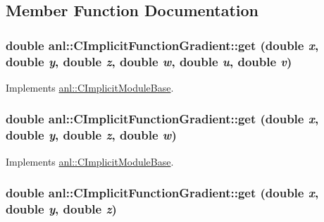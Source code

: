 \subsection{Member Function Documentation}
\hypertarget{classanl_1_1CImplicitFunctionGradient_ad37b8c002f1b4b44f0dd8af144fa59a8}{
\subsubsection[{get}]{\setlength{\rightskip}{0pt plus 5cm}double anl::CImplicitFunctionGradient::get (double {\em x}, \/  double {\em y}, \/  double {\em z}, \/  double {\em w}, \/  double {\em u}, \/  double {\em v})}}
\label{classanl_1_1CImplicitFunctionGradient_ad37b8c002f1b4b44f0dd8af144fa59a8}


Implements \hyperlink{classanl_1_1CImplicitModuleBase_aa40b7d54572197612a4fea44b63447eb}{anl::CImplicitModuleBase}.\hypertarget{classanl_1_1CImplicitFunctionGradient_a31fceb058f6c34b8f63d463de1f3f9a6}{
\subsubsection[{get}]{\setlength{\rightskip}{0pt plus 5cm}double anl::CImplicitFunctionGradient::get (double {\em x}, \/  double {\em y}, \/  double {\em z}, \/  double {\em w})}}
\label{classanl_1_1CImplicitFunctionGradient_a31fceb058f6c34b8f63d463de1f3f9a6}


Implements \hyperlink{classanl_1_1CImplicitModuleBase_a3cf520bdab59631864253c03b4e1723f}{anl::CImplicitModuleBase}.\hypertarget{classanl_1_1CImplicitFunctionGradient_a4844ed9eeaa55d149d5f918915a54f12}{
\subsubsection[{get}]{\setlength{\rightskip}{0pt plus 5cm}double anl::CImplicitFunctionGradient::get (double {\em x}, \/  double {\em y}, \/  double {\em z})}}
\label{classanl_1_1CImplicitFunctionGradient_a4844ed9eeaa55d149d5f918915a54f12}


